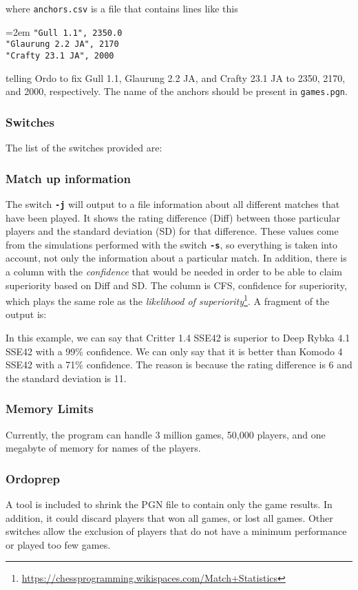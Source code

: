 \documentclass[12pt]{article}
\newcommand{\swtch} [1] {\texttt{\textbf{#1}}}
\newcommand{\filename} [1] {\texttt{#1}}
\newcommand{\cmdln}[1]{
	\par
	\begingroup
		\leftskip=2em
		\addtolength{\rightskip}{0em}
		\noindent \small{\texttt{#1}}
		\par
	\endgroup
}
\newcommand{\inctxt}[1]{
	\begingroup
    \fontsize{9pt}{11pt}\selectfont
		 
	\endgroup
}
\begin{document}
where \filename{anchors.csv} is a file that contains lines like this

\cmdln{"Gull 1.1", 2350.0\\
"Glaurung 2.2 JA", 2170\\
"Crafty 23.1 JA", 2000}

telling Ordo to fix Gull 1.1, Glaurung 2.2 JA, and Crafty 23.1 JA to 2350, 2170, and 2000, respectively.
The name of the anchors should be present in \filename{games.pgn}.

\subsubsection*{Switches}

The list of the switches provided are:
\inctxt{tmp-switches.txt}

\subsubsection*{Match up information}

The switch \swtch{-j} will output to a file information about all different matches that have been played.
It shows the rating difference (Diff) between those particular players and the standard deviation (SD) for that difference.
These values come from the simulations performed with the switch \swtch{-s}, so everything is taken into account, not only the information about a particular match.
In addition, there is a column with the \textit{confidence} that would be needed in order to be able to claim superiority based on Diff and SD. 
The column is CFS, confidence for superiority, which plays the same role as the \textit{likelihood of superiority}\footnote{\url{https://chessprogramming.wikispaces.com/Match+Statistics}}.
A fragment of the output is:

\inctxt{readme-example-j-switch.txt}
In this example, we can say that Critter 1.4 SSE42 is superior to Deep Rybka 4.1 SSE42 with a 99\% confidence. We can only say that it is better than Komodo 4 SSE42 with a 71\% confidence. The reason is because the rating difference is 6 and the standard deviation is 11.

\subsubsection*{Memory Limits}
Currently, the program can handle 3 million games, 50,000 players, and one megabyte of memory for names of the players.

\subsubsection*{Ordoprep}
A tool is included to shrink the PGN file to contain only the game results. 
In addition, it could discard players that won all games, or lost all games. 
Other switches allow the exclusion of players that do not have a minimum performance or played too few games.
\end{document}
